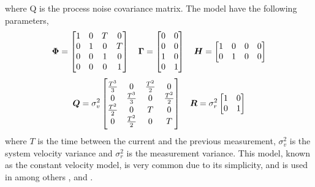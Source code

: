 where Q is the process noise covariance matrix. The model have the following parameters,
\begin{equation*}
\bm{\Phi} =	\begin{bmatrix}
1 & 0 & T & 0 \\
0 & 1 & 0 & T \\
0 & 0 & 1 & 0 \\
0 & 0 & 0 & 1 \\
\end{bmatrix} \quad
\bm{\Gamma} = \begin{bmatrix}
0 & 0 \\
0 & 0 \\
1 & 0 \\
0 & 1 \\
\end{bmatrix} \quad
\bm{H} = \begin{bmatrix}
1 & 0 & 0 & 0 \\
0 & 1 & 0 & 0 \\
\end{bmatrix}
\end{equation*}
\begin{equation*}
\bm{Q}	= \sigma_v^2 \begin{bmatrix}
\frac{T^3}{3} 	& 0 				& \frac{T^2}{2}	& 0 			\\
0 				& \frac{T^3}{3}  	& 0 			& \frac{T^2}{2}	\\
\frac{T^2}{2}	& 0					& T				& 0				\\
0				& \frac{T^2}{2}		& 0				& T				\\
\end{bmatrix} \quad
\bm{R} = \sigma_r^2 \begin{bmatrix}
1 & 0 \\
0 & 1 \\
\end{bmatrix}
\end{equation*}
where $T$ is the time between the current and the previous measurement, $\sigma_v^2$ is the system velocity variance and $\sigma_r^2$ is the measurement variance. This model, known as the constant velocity model,  is very common due to its simplicity, and is used in among others \cite{Reid1978}, \cite{Coraluppi2000} and \cite{Brekke2012}.

